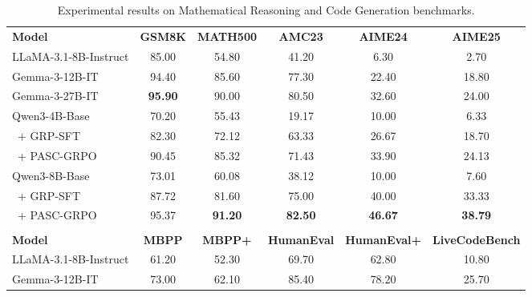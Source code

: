 \begin{table}[htbp]
    \centering
    \caption{Experimental results on Mathematical Reasoning and Code Generation benchmarks.}
    \label{tab:main_results}
    \small
    \renewcommand{\arraystretch}{1.2} %
    \begin{tabular}{lccccc}
        \toprule
        \rowcolor{gray!15}
        \multicolumn{6}{c}{\textbf{Mathematical Reasoning}} \\
        \midrule
        \textbf{Model} & \textbf{GSM8K} & \textbf{MATH500} & \textbf{AMC23} & \textbf{AIME24} & \textbf{AIME25} \\
        \midrule
        LLaMA-3.1-8B-Instruct & 85.00 & 54.80 & 41.20 & 6.30 & 2.70  \\
        Gemma-3-12B-IT         & 94.40 & 85.60 & 77.30 & 22.40 & 18.80  \\
        Gemma-3-27B-IT         & \textbf{95.90} & 90.00 & 80.50 & 32.60 & 24.00  \\
        \midrule
        Qwen3-4B-Base               & 70.20 & 55.43 & 19.17 & 10.00 & 6.33  \\
        \rowcolor{cyan!5} %
        ~+ GRP-SFT             & 82.30 & 72.12 & 63.33 & 26.67 & 18.70  \\
        \rowcolor{cyan!5} %
        ~+ PASC-GRPO           & 90.45 & 85.32 & 71.43 & 33.90 & 24.13  \\
        \midrule
        Qwen3-8B-Base               & 73.01 & 60.08 & 38.12 & 10.00 & 7.60  \\
        \rowcolor{cyan!5} %
        ~+ GRP-SFT             & 87.72 & 81.60 & 75.00 & 40.00 & 33.33  \\
        \rowcolor{cyan!5} %
        ~+ PASC-GRPO           & 95.37 & \textbf{91.20} & \textbf{82.50} & \textbf{46.67} & \textbf{38.79}  \\
        \midrule %
        \rowcolor{gray!15}
        \multicolumn{6}{c}{\textbf{Code Generation}} \\
        \midrule
        \textbf{Model} & \textbf{MBPP} & \textbf{MBPP+} & \textbf{HumanEval} & \textbf{HumanEval+} & \textbf{LiveCodeBench} \\
        \midrule
        LLaMA-3.1-8B-Instruct & 61.20 & 52.30 & 69.70 & 62.80 & 10.80  \\
        Gemma-3-12B-IT         & 73.00 & 62.10 & 85.40 & 78.20 & 25.70  \\

\end{tabular}
\end{table}
